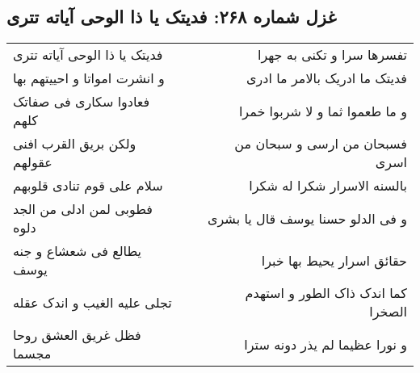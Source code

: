 \begin{center}
\section*{غزل شماره ۲۶۸: فدیتک یا ذا الوحی آیاته تتری}
\label{sec:0268}
\begin{longtable}{l p{0.5cm} r}
فدیتک یا ذا الوحی آیاته تتری
&&
تفسرها سرا و تکنی به جهرا
\\
و انشرت امواتا و احییتهم بها
&&
فدیتک ما ادریک بالامر ما ادری
\\
فعادوا سکاری فی صفاتک کلهم
&&
و ما طعموا ثما و لا شربوا خمرا
\\
ولکن بریق القرب افنی عقولهم
&&
فسبحان من ارسی و سبحان من اسری
\\
سلام علی قوم تنادی قلوبهم
&&
بالسنه الاسرار شکرا له شکرا
\\
فطوبی لمن ادلی من الجد دلوه
&&
و فی الدلو حسنا یوسف قال یا بشری
\\
یطالع فی شعشاع و جنه یوسف
&&
حقائق اسرار یحیط بها خبرا
\\
تجلی علیه الغیب و اندک عقله
&&
کما اندک ذاک الطور و استهدم الصخرا
\\
فظل غریق العشق روحا مجسما
&&
و نورا عظیما لم یذر دونه سترا
\\
\end{longtable}
\end{center}
